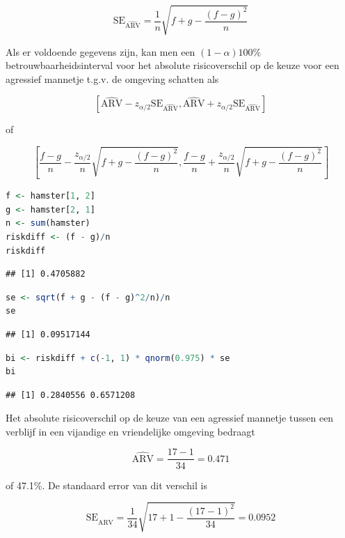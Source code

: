 \documentclass[
  12pt,dutch,coursenotes]{book}
\theoremstyle{definition}
\theoremstyle{definition}
\theoremstyle{definition}
\theoremstyle{definition}
\theoremstyle{remark}
\begin{document}
\begin{equation*}
\text{SE}_{\widehat{\text{ARV}}}=\frac{1}{n}\sqrt{f+g-\frac{(f-g)^2}{n}}
\end{equation*}

Als er voldoende gegevens zijn, kan men een \((1-\alpha)100\%\)
betrouwbaarheidsinterval voor het absolute risicoverschil op de keuze voor een agressief mannetje t.g.v. de omgeving schatten
als

\[\left[\widehat{\text{ARV}}-z_{\alpha/2}\text{SE}_{\widehat{\text{ARV}}},\widehat{\text{ARV}}+z_{\alpha/2}\text{SE}_{\widehat{\text{ARV}}}\right]\]

of

\[\left[\frac{f-g}{n}-\frac{z_{\alpha/2}}{n}\sqrt{f+g-\frac{(f-g)^2}{n}},\frac{f-g}{n}+\frac{z_{\alpha/2}}{n}\sqrt{f+g-\frac{(f-g)^2}{n}}\right] \]

\begin{lstlisting}[language=R]
f <- hamster[1, 2]
g <- hamster[2, 1]
n <- sum(hamster)
riskdiff <- (f - g)/n
riskdiff
\end{lstlisting}

\begin{lstlisting}
## [1] 0.4705882
\end{lstlisting}

\begin{lstlisting}[language=R]
se <- sqrt(f + g - (f - g)^2/n)/n
se
\end{lstlisting}

\begin{lstlisting}
## [1] 0.09517144
\end{lstlisting}

\begin{lstlisting}[language=R]
bi <- riskdiff + c(-1, 1) * qnorm(0.975) * se
bi
\end{lstlisting}

\begin{lstlisting}
## [1] 0.2840556 0.6571208
\end{lstlisting}

Het absolute risicoverschil op de keuze van een agressief mannetje tussen een verblijf in een vijandige en vriendelijke omgeving bedraagt

\begin{equation*}
\widehat{\text{ARV}}=\frac{17-1}{34}=0.471
\end{equation*}

of 47.1\%. De standaard error van dit verschil is

\begin{equation*}
\text{SE}_{\widehat{\text{ARV}}}=\frac{1}{34}\sqrt{17+1-\frac{(17-1)^2}{34}}=0.0952
\end{equation*}
\end{document}

